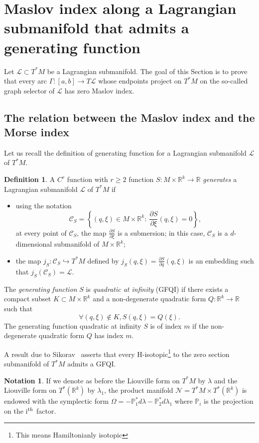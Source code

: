 \documentclass[10pt,a4paper]{amsart}
\numberwithin{equation}{section}
\newcommand*\cC{\mathcal{C}}
\newcommand*\cl{\mathcal{L}}
\newcommand*\cN{\mathcal{N}}
\newcommand*\R{\mathbb{R}}
\newcommand{\bbP}{\mathbb{P}}
\let\oldforall\forall
\renewcommand*{\forall}{\mathrel{\oldforall}}
\theoremstyle{definition}
\newtheorem{defi}[theo]{Definition}
\newtheorem{nota}[theo]{Notation}
\theoremstyle{remark}
\begin{document}
\section{Maslov index along a Lagrangian submanifold that admits a generating function}\label{section gfqi}
Let $\cl\subset T^*M$ be a Lagrangian submanifold. The goal of this Section is to prove that every arc $\Gamma:[a,b]\to T\cl$ whose endpoints project on $T^*M$ on the so-called graph selector of $\cl$ has zero Maslov index.
\subsection{The relation between the Maslov index and the Morse index} Let us recall the definition of generating function for a Lagrangian submanifold $\cl$ of $T^*M$.

\begin{defi}
A $C^r$ function with $r\geq 2$ function $S:M\times \R^k\rightarrow \R$ {\sl generates} a Lagrangian submanifold $\cl$ of $T^*M$ if
\begin{itemize}
\item using the notation
\[
\cC_S=\left\{ (q, \xi)\in M\times \R^k :\ \frac{\partial S}{\partial \xi}(q, \xi)=0\right\},
\]
at every point of $\cC_S$, the map $\frac{\partial S}{\partial \xi}$ is a submersion; in this case, $\cC_S$ is a $d$-dimensional submanifold of $M\times \R^k$;
\item the map $j_S: \cC_S\hookrightarrow T^*M$ defined by $j_S(q, \xi)=\frac{\partial S}{\partial q}(q, \xi)$ is an embedding such that $j_S(\cC_S)=\cl$.
\end{itemize}
The \emph{generating function} $S$ is \emph{quadratic at infinity} (GFQI) if there exists a compact subset $K\subset M\times \R^k$ and a non-degenerate quadratic form $Q:\R^k\rightarrow \R$ such that
\[
\forall (q, \xi)\notin K, S(q, \xi)=Q(\xi).
\]
The generating function quadratic at infinity $S$ is of index $m$ if the non-degenerate quadratic form $Q$ has index $m$.
\end{defi}

A result due to Sikorav~\cite{Bru1991,Sik1987} asserts that every H-isotopic\footnote{This means Hamiltonianly isotopic} to the zero section submanifold of $T^*M$ admits a GFQI.

\begin{nota}
If we denote as before the Liouville form on $T^*M$ by $\lambda$ and the Liouville form on $T^*(\R^k)$ by $\lambda_1$, the product manifold $\cN=T^*M\times T^*(\R^k)$ is endowed with the symplectic form
$\Omega=-\bbP_1^*d\lambda-\bbP_2^*d\lambda_1$ where $\bbP_i$ is the projection on the i$^{\rm th}$ factor.
\end{nota}
\end{document}
